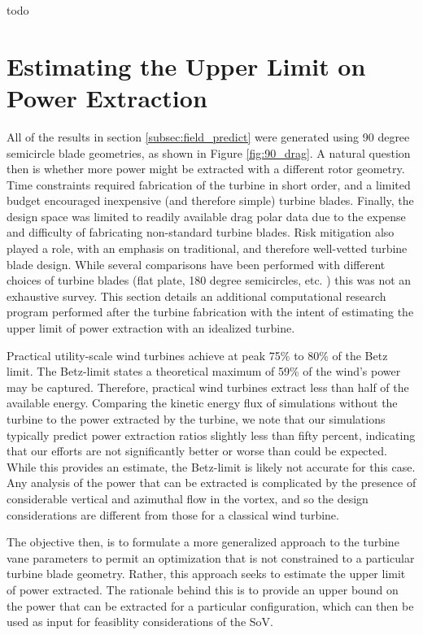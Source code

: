 todo

\section{Estimating the Upper Limit on Power Extraction}
\label{sec:peak_estimate}

All of the results in section \ref{subsec:field_predict} were generated
using 90 degree semicircle blade geometries, as shown in Figure
\ref{fig:90_drag}. A natural question then is whether more power might
be extracted with a different rotor geometry. Time constraints required
fabrication of the turbine in short 
order, and a limited budget encouraged inexpensive (and therefore
simple) turbine blades. Finally, the design space was limited to 
readily available drag polar data due to the expense and difficulty of
fabricating non-standard turbine blades. Risk mitigation also played a
role, with an emphasis on traditional, and therefore well-vetted turbine
blade design. While several comparisons have been performed with
different choices of turbine blades (flat plate, 180 degree semicircles,
etc. ) this was not an exhaustive survey. This section details an
additional computational research program performed after the turbine
fabrication with the intent of estimating the upper limit of power
extraction with an idealized turbine. 

Practical utility-scale wind turbines achieve at peak 75\% to 80\% of
the Betz limit\cite{burton2001wind}. The Betz-limit states a theoretical
maximum of 59\% of the wind's power may be captured. Therefore,
practical wind turbines extract less than half of the available energy. 
Comparing the
kinetic energy flux of simulations without the turbine to the power
extracted by the turbine, we note that our simulations typically predict
power extraction ratios slightly less than fifty percent, indicating
that our efforts are not significantly better or worse than could be
expected. While this provides an estimate, the Betz-limit is likely not
accurate for this case. Any analysis of the power that can be extracted
is complicated by the presence of considerable vertical and azimuthal
flow in the vortex, and so the design considerations are different from
those for a classical wind turbine. 

The objective then, is to formulate a more generalized approach to the
turbine vane parameters to permit an optimization that is not
constrained to a particular turbine blade geometry. Rather, this
approach seeks to estimate the upper limit of power extracted. The
rationale behind this is to provide an upper bound on the power that can 
be extracted for a particular configuration, which can then be used as
input for feasiblity considerations of the SoV.  

